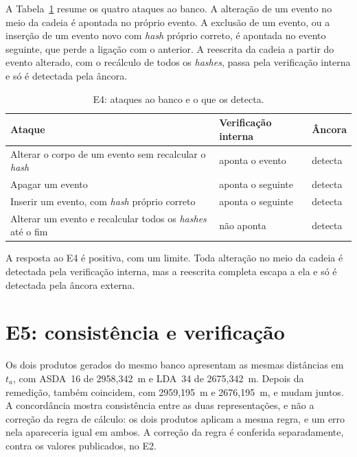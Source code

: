 A Tabela~\ref{tab:res-e4} resume os quatro ataques ao banco. A alteração de um evento no meio da cadeia é apontada no próprio evento. A exclusão de um evento, ou a inserção de um evento novo com \textit{hash} próprio correto, é apontada no evento seguinte, que perde a ligação com o anterior. A reescrita da cadeia a partir do evento alterado, com o recálculo de todos os \textit{hashes}, passa pela verificação interna e só é detectada pela âncora.

\begin{table}[htbp]
    \centering
    \caption{E4: ataques ao banco e o que os detecta.}
    \label{tab:res-e4}
    \begin{tabularx}{\linewidth}{X l l}
        \toprule
        Ataque & Verificação interna & Âncora \\
        \midrule
        Alterar o corpo de um evento sem recalcular o \textit{hash} & aponta o evento & detecta \\
        Apagar um evento & aponta o seguinte & detecta \\
        Inserir um evento, com \textit{hash} próprio correto & aponta o seguinte & detecta \\
        Alterar um evento e recalcular todos os \textit{hashes} até o fim & não aponta & detecta \\
        \bottomrule
    \end{tabularx}
    \par{}
\end{table}

A resposta ao E4 é positiva, com um limite. Toda alteração no meio da cadeia é detectada pela verificação interna, mas a reescrita completa escapa a ela e só é detectada pela âncora externa.

\section{E5: consistência e verificação}\label{sec:res-e5}

Os dois produtos gerados do mesmo banco apresentam as mesmas distâncias em $t_a$, com ASDA~16 de 2958,342~m e LDA~34 de 2675,342~m. Depois da remedição, também coincidem, com 2959,195~m e 2676,195~m, e mudam juntos. A concordância mostra consistência entre as duas representações, e não a correção da regra de cálculo: os dois produtos aplicam a mesma regra, e um erro nela apareceria igual em ambos. A correção da regra é conferida separadamente, contra os valores publicados, no E2.

